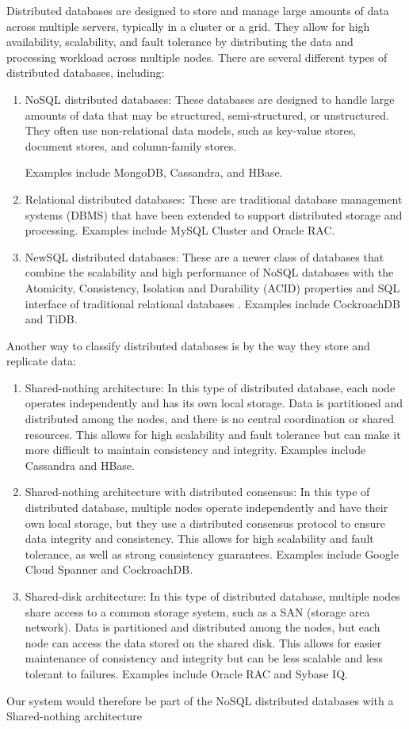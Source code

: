 \documentclass{article}
\begin{document}
Distributed databases are designed to store and manage large amounts of data across multiple servers, typically in a cluster or a grid. They allow for high availability, scalability, and fault tolerance by distributing the data and processing workload across multiple nodes.
There are several different types of distributed databases, including:
\begin{enumerate}
\item NoSQL distributed databases: These databases are designed to handle large amounts of data that may be structured, semi-structured, or unstructured. They often use non-relational data models, such as key-value stores, document stores, and column-family stores.
\cite{reference_2}

Examples include MongoDB, Cassandra, and HBase.
\item Relational distributed databases: These are traditional database management systems (DBMS) that have been extended to support distributed storage and processing. Examples include MySQL Cluster and Oracle RAC.
\item NewSQL distributed databases: These are a newer class of databases that combine the scalability and high performance of NoSQL databases with the Atomicity, Consistency, Isolation and Durability (ACID) properties and SQL interface of traditional relational databases . Examples include CockroachDB and TiDB.
\cite{reference_3}

\end{enumerate}
Another way to classify distributed databases is by the way they store and replicate data:
\begin{enumerate}
\item Shared-nothing architecture: In this type of distributed database, each node operates independently and has its own local storage. Data is partitioned and distributed among the nodes, and there is no central coordination or shared resources. This allows for high scalability and fault tolerance but can make it more difficult to maintain consistency and integrity. Examples include Cassandra and HBase.
\item Shared-nothing architecture with distributed consensus: In this type of distributed database, multiple nodes operate independently and have their own local storage, but they use a distributed consensus protocol to ensure data integrity and consistency. This allows for high scalability and fault tolerance, as well as strong consistency guarantees. Examples include Google Cloud Spanner and CockroachDB.
\item Shared-disk architecture: In this type of distributed database, multiple nodes share access to a common storage system, such as a SAN (storage area network). Data is partitioned and distributed among the nodes, but each node can access the data stored on the shared disk. This allows for easier maintenance of consistency and integrity but can be less scalable and less tolerant to failures. Examples include Oracle RAC and Sybase IQ.
\end{enumerate}
Our system would therefore be part of the NoSQL distributed databases with a Shared-nothing architecture
\end{document}
